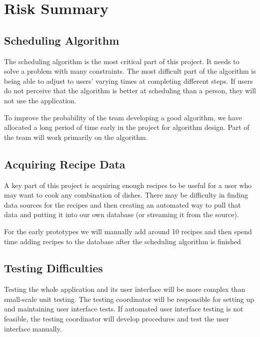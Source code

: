 \documentclass[10pt]{article}
\begin{document}
\section{Risk Summary}

\subsection{Scheduling Algorithm}

The scheduling algorithm is the most critical part of this project. It needs to
solve a problem with many constraints. The most difficult part of the algorithm is being able to adjust to users' varying times at completing different steps. If users do not perceive that the
algorithm is better at scheduling than a person, they will not use the application.

To improve the probability of the team developing a good algorithm, we have allocated a long period of time
early in the project for algorithm design. Part of the team will work primarily
on the algorithm.

\subsection{Acquiring Recipe Data}

A key part of this project is acquiring enough recipes to be useful for a user who may want to cook any combination of dishes. There may be difficulty in finding data sources for the recipes and then creating an automated way to pull that data and putting it into our own database (or streaming it from the source).

For the early prototypes we will manually add around 10 recipes and then spend time adding recipes to the database after the scheduling algorithm is finished

\subsection{Testing Difficulties}

Testing the whole application and its user interface will be more complex than
small-scale unit testing. The testing coordinator will be responsible for
setting up and maintaining user interface tests. If automated user interface
testing is not feasible, the testing coordinator will develop procedures and
test the user interface manually.
\end{document}
